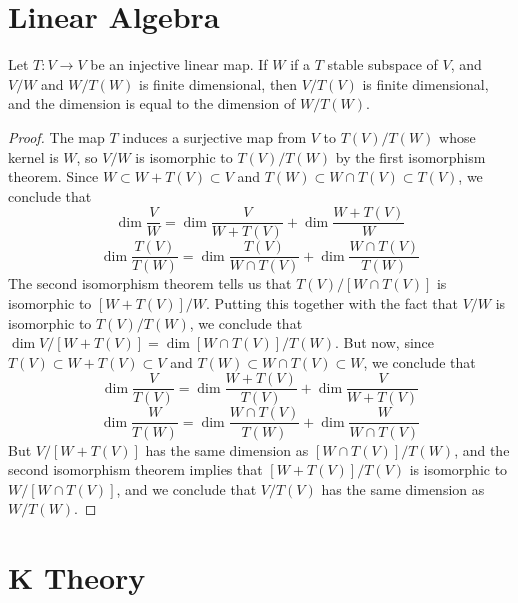 \chapter{Linear Algebra}

\begin{theorem}
    Let $T:V \to V$ be an injective linear map. If $W$ if a $T$ stable subspace of $V$, and $V/W$ and $W/T(W)$ is finite dimensional, then $V/T(V)$ is finite dimensional, and the dimension is equal to the dimension of $W/T(W)$.
\end{theorem}
\begin{proof}
    The map $T$ induces a surjective map from $V$ to $T(V)/T(W)$ whose kernel is $W$, so $V/W$ is isomorphic to $T(V)/T(W)$ by the first isomorphism theorem. Since $W \subset W + T(V) \subset V$ and $T(W) \subset W \cap T(V) \subset T(V)$, we conclude that
    \[ \dim \frac{V}{W} = \dim \frac{V}{W + T(V)} + \dim \frac{W + T(V)}{W} \]
    \[ \dim \frac{T(V)}{T(W)} = \dim \frac{T(V)}{W \cap T(V)} + \dim \frac{W \cap T(V)}{T(W)} \]
    The second isomorphism theorem tells us that $T(V)/[W \cap T(V)]$ is isomorphic to $[W + T(V)]/W$. Putting this together with the fact that $V/W$ is isomorphic to $T(V)/T(W)$, we conclude that $\dim V/[W + T(V)] = \dim [W \cap T(V)]/T(W)$. But now, since $T(V) \subset W + T(V) \subset V$ and $T(W) \subset W \cap T(V) \subset W$, we conclude that
    \[ \dim \frac{V}{T(V)} = \dim \frac{W + T(V)}{T(V)} + \dim \frac{V}{W + T(V)} \]
    \[ \dim \frac{W}{T(W)} = \dim \frac{W \cap T(V)}{T(W)} + \dim \frac{W}{W \cap T(V)} \]
    But $V/[W + T(V)]$ has the same dimension as $[W \cap T(V)]/T(W)$, and the second isomorphism theorem implies that $[W + T(V)]/T(V)$ is isomorphic to $W/[W \cap T(V)]$, and we conclude that $V/T(V)$ has the same dimension as $W/T(W)$.
\end{proof}

\chapter{K Theory}

